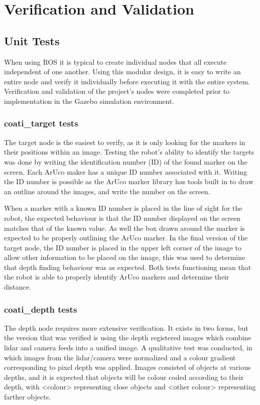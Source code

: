 \documentclass{article}[12]
\begin{document}
\section{Verification and Validation} 
	
		\subsection{Unit Tests}
	
	When using ROS it is typical to create individual nodes that all execute independent of one another. Using this modular design, it is easy to write an entire node and verify it individually before executing it with the entire system. Verification and validation of the project's nodes were completed prior to implementation in the Gazebo simulation environment.
	
	\subsubsection{coati\_target tests}
	
	The target node is the easiest to verify, as it is only looking for the markers in their positions within an image. Testing the robot's ability to identify the targets was done by writing the identification number (ID) of the found marker on the screen. Each ArUco maker has a unique ID number associated with it. Writing the ID number is possible as the ArUco marker library has tools built in to draw an outline around the images, and write the number on the screen. 
	
	When a marker with a known ID number is placed in the line of sight for the robot, the expected behaviour is that the ID number displayed on the screen matches that of the known value. As well the box drawn around the marker is expected to be properly outlining the ArUco marker. In the final version of the target node, the ID number is placed in the upper left corner of the image to allow other information to be placed on the image, this was used to determine that depth finding behaviour was as expected. Both tests functioning mean that the robot is able to properly identify ArUco markers and determine their distance. 
	
	\subsubsection{coati\_depth tests}
	
	The depth node requires more extensive verification. It exists in two forms, but the version that was verified is using the depth registered images which combine lidar and camera feeds into a unified image. A qualitative test was conducted, in which images from the lidar/camera were normalized and a colour gradient corresponding to pixel depth was applied. Images consisted of objects at various depths, and it is expected that objects will be colour coded according to their depth, with <colour> representing close objects and <other colour> representing farther objects. 
	
\end{document}
